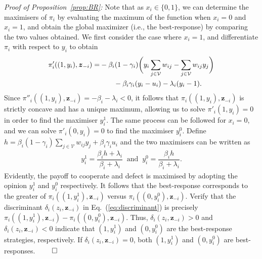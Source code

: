 \documentclass[letterpaper, 10 pt, conference]{ieeeconf}  %
\newcommand{\vect}[1]{\boldsymbol{#1}}
\renewcommand{\eqref}[1]{Eq.~(\ref{#1})}  %
\begin{document}

\appendix

\textit{Proof of Proposition~\ref{prop:BR}:} Note that as $x_i\in\{0,1\}$, we can determine the maximisers of $\pi_i$ by evaluating the maximum of the function when $x_i=0$ and $x_i=1$, and obtain the global maximizer (i.e., the best-response) by comparing the two values obtained. We first consider the case where $x_i=1$, and differentiate $\pi_i$ with respect to $y_i$ to obtain
\begin{align}
    \pi'_i((1,y_i),\vect{z}_{-i}) = &-\beta_i(1-\gamma_i)\bigg(y_i\sum_{j\in\mathcal{V}}w_{ij} -\sum_{j\in\mathcal{V}}w_{ij}y_j\bigg) \notag\\ 
    &\qquad -\beta_i\gamma_i(y_i-u_i)-\lambda_i(y_i-1).
\end{align}
Since $\pi''_i((1,y_i),\vect z_{-i}) = -\beta_i-\lambda_i<0$, it follows that $\pi_i((1,y_i),\vect z_{-i})$ is strictly concave and has a unique maximum, allowing us to solve $\pi'_i(1,y_i) = 0$ in order to find the maximiser $y_i^1$. The same process can be followed for $x_i=0$, and we can solve $\pi'_i(0,y_i) = 0$ to find the maximiser $y_i^0$. Define $h=\beta_i(1-\gamma_i)\sum_{j\in\mathcal{V}}w_{ij}y_j+\beta_i\gamma_i u_i$ and the two maximisers can be written as
\begin{align}
    y_i^{1}=\dfrac{\beta_ih+\lambda_i}{\beta_i+\lambda_i}\;\;\text{and}\;\;
    y_i^{0}=\dfrac{\beta_ih}{\beta_i+\lambda_i}.
\end{align}
Evidently, the payoff to cooperate and defect is maximised by adopting the opinion $y_i^1$ and $y_i^0$ respectively. It follows that the best-response corresponds to the greater of $\pi_i((1,y_i^{1}),\vect{z}_{-i})$ versus $\pi_i((0,y_i^{0}),\vect{z}_{-i})$. Verify that the discriminant $\delta_i(z_i,\vect{z}_{-i})$ in \eqref{eq:discriminant} is precisely $\pi_i((1,y_i^{1}),\vect{z}_{-i})-\pi_i((0,y_i^{0}),\vect{z}_{-i})$.
Thus, $\delta_i(z_i,\vect{z}_{-i}) > 0$ and $\delta_i(z_i,\vect{z}_{-i}) < 0$ indicate that $(1,y_i^{1})$ and $(0,y_i^{0})$ are the best-response strategies, respectively. If $\delta_i(z_i,\vect{z}_{-i}) = 0$, both $(1,y_i^{1})$ and $(0,y_i^{0})$ are best-responses. \hfill $\qed$



\end{document}
